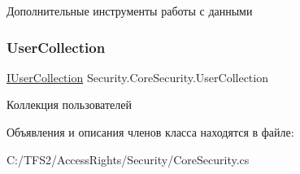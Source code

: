 Дополнительные инструменты работы с данными 

\mbox{\label{class_security_1_1_core_security_a2cd468b36ea7c64dd98425cb1b221543}} 
\subsubsection{\texorpdfstring{User\+Collection}{UserCollection}}
{\footnotesize\ttfamily \hyperlink{interface_security_1_1_interfaces_1_1_collections_1_1_i_user_collection}{I\+User\+Collection} Security.\+Core\+Security.\+User\+Collection\hspace{0.3cm}{\ttfamily [get]}}



Коллекция пользователей 



Объявления и описания членов класса находятся в файле\+:\begin{DoxyCompactItemize}
\item 
C\+:/\+T\+F\+S2/\+Access\+Rights/\+Security/Core\+Security.\+cs\end{DoxyCompactItemize}
